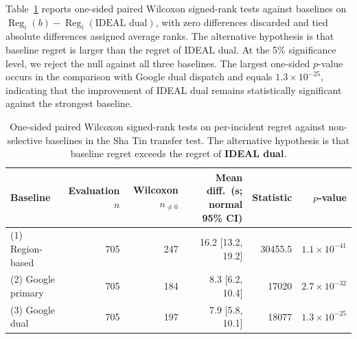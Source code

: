 \documentclass[11pt, letterpaper, oneside, reqno]{amsart}
\begin{document}
Table~\ref{tab:wilcoxon-sha-tin} reports one-sided paired Wilcoxon signed-rank tests against baselines on
$\operatorname{Reg}_i(b)-\operatorname{Reg}_i(\text{IDEAL dual})$, with zero differences discarded and tied absolute differences assigned average ranks. The alternative hypothesis is that baseline regret is larger than the regret of IDEAL dual. At the 5\% significance level, we reject the null against all three baselines. The largest one-sided $p$-value occurs in the comparison with Google dual dispatch and equals $1.3\times10^{-25}$, indicating that the improvement of IDEAL dual remains statistically significant against the strongest baseline.

\begin{table}[h]
\centering
\small
\caption{One-sided paired Wilcoxon signed-rank tests on per-incident regret against non-selective baselines in the Sha Tin transfer test. The alternative hypothesis is that baseline regret exceeds the regret of \textbf{IDEAL dual}.}
\label{tab:wilcoxon-sha-tin}
\begin{tabular}{lrrrrr}
\toprule
Baseline & Evaluation $n$ & Wilcoxon $n_{\ne0}$ & Mean diff.\ (s; normal 95\% CI) & Statistic & $p$-value \\
\midrule
(1) Region-based & 705 & 247 & 16.2 [13.2, 19.2] & 30455.5 & $1.1\times 10^{-41}$ \\
(2) Google primary & 705 & 184 & 8.3 [6.2, 10.4] & 17020 & $2.7\times 10^{-32}$ \\
(3) Google dual & 705 & 197 & 7.9 [5.8, 10.1] & 18077 & $1.3\times 10^{-25}$ \\
\bottomrule
\end{tabular}
\end{table}
\end{document}
